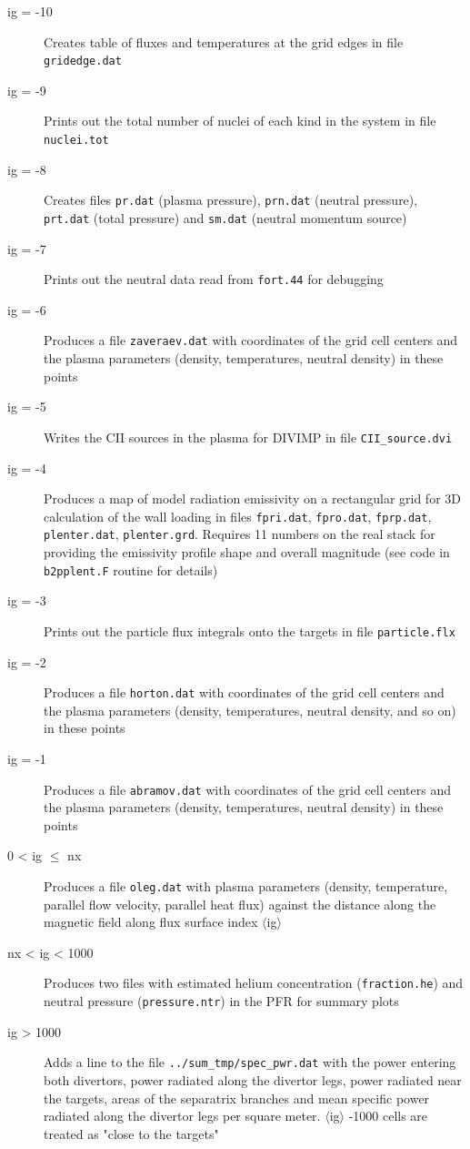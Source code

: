 \documentclass[a4paper,10pt]{report}
\begin{document}
\begin{description}
  \item[ig = -10] Creates table of fluxes and temperatures at the grid edges in file {\tt gridedge.dat}
  \item[ig = -9] Prints out the total number of nuclei of each kind in the system in file {\tt nuclei.tot}
  \item[ig = -8] Creates files {\tt pr.dat} (plasma pressure), {\tt prn.dat} (neutral pressure), {\tt prt.dat} (total pressure) and {\tt sm.dat} (neutral momentum source)
  \item[ig = -7] Prints out the neutral data read from {\tt fort.44} for debugging
  \item[ig = -6] Produces a file {\tt zaveraev.dat} with coordinates of the grid cell centers and the plasma parameters (density, temperatures, neutral density) in these points
  \item[ig = -5] Writes the C{\sc II} sources in the plasma for DIVIMP in file {\tt CII\_source.dvi}
  \item[ig = -4] Produces a map of model radiation emissivity on a rectangular grid for 3D calculation of the wall loading in files {\tt fpri.dat}, {\tt fpro.dat}, {\tt fprp.dat}, {\tt plenter.dat}, {\tt plenter.grd}. Requires 11 numbers on the real stack for providing the emissivity profile shape and overall magnitude (see code in {\tt b2pplent.F} routine for details)
  \item[ig = -3] Prints out the particle flux integrals onto the targets in file {\tt particle.flx}
  \item[ig = -2] Produces a file {\tt horton.dat} with coordinates of the grid cell centers and the plasma parameters (density, temperatures, neutral density, and so on) in these points
  \item[ig = -1] Produces a file {\tt abramov.dat} with coordinates of the grid cell centers and the plasma parameters (density, temperatures, neutral density) in these points
  \item[0 < ig $\le$ nx] Produces a file {\tt oleg.dat} with plasma parameters (density, temperature, parallel flow velocity, parallel heat flux) against the distance along the magnetic field along flux surface index $\langle$ig$\rangle$
  \item[nx < ig < 1000] Produces two files with estimated helium concentration ({\tt fraction.he}) and neutral pressure ({\tt pressure.ntr}) in the PFR for summary plots
  \item[ig > 1000] Adds a line to the file {\tt ../sum\_tmp/spec\_pwr.dat} with the power entering both divertors, power radiated along the divertor legs, power radiated near the targets, areas of the separatrix branches and mean specific power radiated along the divertor legs per square meter. $\langle$ig$\rangle$ -1000 cells are treated as "close to the targets"
\end{description}
\end{document}
